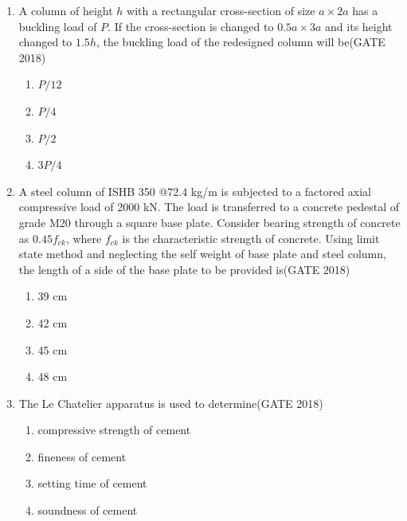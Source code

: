 \documentclass[journal,12pt,onecolumn]{IEEEtran}
\theoremstyle{remark}
\begin{document}
\begin{enumerate}
\item A column of height $h$ with a rectangular cross-section of size $a \times 2a$ has a buckling load of $P$. If the cross-section is changed to $0.5a \times 3a$ and its height changed to $1.5h$, the buckling load of the redesigned column will be\hfill{(GATE 2018)}
\begin{multicols}{4}
\begin{enumerate}
    \item $P/12$
    \item $P/4$
    \item $P/2$
    \item $3P/4$
\end{enumerate}
\end{multicols}
\vspace{1cm}
\item A steel column of ISHB 350 @72.4 kg/m is subjected to a factored axial compressive load of 2000 kN. The load is transferred to a concrete pedestal of grade M20 through a square base plate. Consider bearing strength of concrete as $0.45 f_{ck}$, where $f_{ck}$ is the characteristic strength of concrete. Using limit state method and neglecting the self weight of base plate and steel column, the length of a side of the base plate to be provided is\hfill{(GATE 2018)}
\begin{multicols}{4}
\begin{enumerate}
    \item 39 cm
    \item 42 cm
    \item 45 cm
    \item 48 cm
\end{enumerate}
\end{multicols}
\vspace{1cm}
\newpage

\item The Le Chatelier apparatus is used to determine\hfill{(GATE 2018)}
\begin{multicols}{4}
\begin{enumerate}
    \item compressive strength of cement
    \item fineness of cement
    \item setting time of cement
    \item soundness of cement
\end{enumerate}
\end{multicols}
\vspace{1cm}


\end{enumerate}
\end{document}
